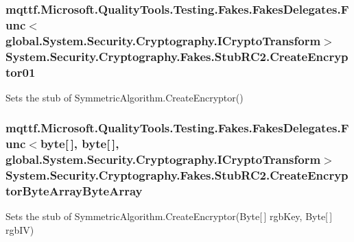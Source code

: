 \hypertarget{class_system_1_1_security_1_1_cryptography_1_1_fakes_1_1_stub_r_c2_a3d35c4c46a795c6be0c95feae3644aca}{
\subsubsection[{Create\-Encryptor01}]{\setlength{\rightskip}{0pt plus 5cm}mqttf.\-Microsoft.\-Quality\-Tools.\-Testing.\-Fakes.\-Fakes\-Delegates.\-Func$<$global.\-System.\-Security.\-Cryptography.\-I\-Crypto\-Transform$>$ System.\-Security.\-Cryptography.\-Fakes.\-Stub\-R\-C2.\-Create\-Encryptor01}}\label{class_system_1_1_security_1_1_cryptography_1_1_fakes_1_1_stub_r_c2_a3d35c4c46a795c6be0c95feae3644aca}


Sets the stub of Symmetric\-Algorithm.\-Create\-Encryptor()

\hypertarget{class_system_1_1_security_1_1_cryptography_1_1_fakes_1_1_stub_r_c2_a29bed6090951f2d4d3eb8018edcb8729}{
\subsubsection[{Create\-Encryptor\-Byte\-Array\-Byte\-Array}]{\setlength{\rightskip}{0pt plus 5cm}mqttf.\-Microsoft.\-Quality\-Tools.\-Testing.\-Fakes.\-Fakes\-Delegates.\-Func$<$byte\mbox{[}$\,$\mbox{]}, byte\mbox{[}$\,$\mbox{]}, global.\-System.\-Security.\-Cryptography.\-I\-Crypto\-Transform$>$ System.\-Security.\-Cryptography.\-Fakes.\-Stub\-R\-C2.\-Create\-Encryptor\-Byte\-Array\-Byte\-Array}}\label{class_system_1_1_security_1_1_cryptography_1_1_fakes_1_1_stub_r_c2_a29bed6090951f2d4d3eb8018edcb8729}


Sets the stub of Symmetric\-Algorithm.\-Create\-Encryptor(\-Byte\mbox{[}$\,$\mbox{]} rgb\-Key, Byte\mbox{[}$\,$\mbox{]} rgb\-I\-V)

